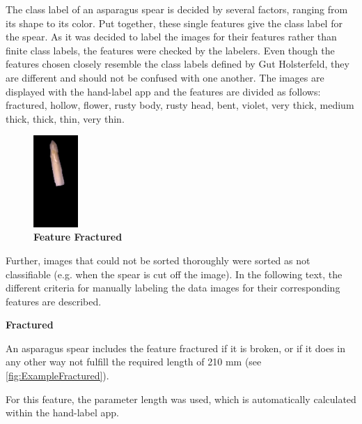 The class label of an asparagus spear is decided by several factors, ranging from its shape to its color. Put together, these single features give the class label for the spear. As it was decided to label the images for their features rather than finite class labels, the features were checked by the labelers. Even though the features chosen closely resemble the class labels defined by Gut Holsterfeld, they are different and should not be confused with one another. The images are displayed with the hand-label app and the features are divided as follows: fractured, hollow, flower, rusty body, rusty head, bent, violet, very thick, medium thick, thick, thin, very thin.

\begin{figure}
  \vspace{20pt}
  \begin{center}
    \includegraphics[width=0.15\textwidth]{Figures/chapter03/example_img_fractured.png}
  \end{center}
  \vspace{-15pt}
  \caption[Example Image Feature Fractured]{ \textbf{Feature Fractured}}
  \vspace{-20pt}
  \label{fig:ExampleFractured}
\end{figure}

Further, images that could not be sorted thoroughly were sorted as not classifiable (e.g. when the spear is cut off the image). In the following text, the different criteria for manually labeling the data images for their corresponding features are described. 

\bigskip
\textbf{Fractured}

An asparagus spear includes the feature fractured if it is broken, or if it does in any other way not fulfill the required length of 210 mm (see \autoref{fig:ExampleFractured}).

For this feature, the parameter length was used, which is automatically calculated within the hand-label app.

\newpage

